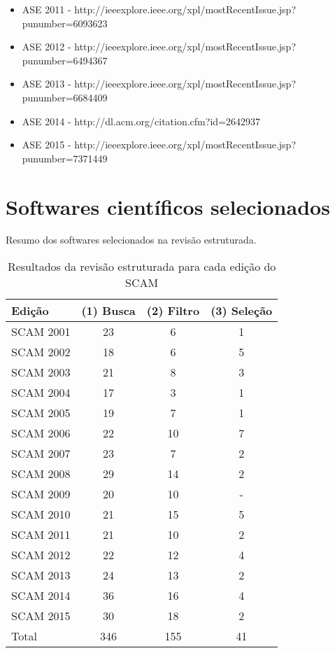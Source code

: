\begin{itemize}
  \item ASE 2011 - {\small http://ieeexplore.ieee.org/xpl/mostRecentIssue.jsp?punumber=6093623}
  \item ASE 2012 - {\small http://ieeexplore.ieee.org/xpl/mostRecentIssue.jsp?punumber=6494367}
  \item ASE 2013 - {\small http://ieeexplore.ieee.org/xpl/mostRecentIssue.jsp?punumber=6684409}
  \item ASE 2014 - {\small http://dl.acm.org/citation.cfm?id=2642937}
  \item ASE 2015 - {\small http://ieeexplore.ieee.org/xpl/mostRecentIssue.jsp?punumber=7371449}
\end{itemize}

\section{Softwares científicos selecionados}
\label{softwares-cientificos}

Resumo dos softwares selecionados na revisão estruturada.

\begin{table}[h]
\caption{Resultados da revisão estruturada para cada edição do SCAM}
\centering
\begin{tabular}{| l | c | c | c |}
  \hline
  Edição & (1) Busca & (2) Filtro & (3) Seleção \\
  \hline
  SCAM 2001 & 23    & 6         & 1           \\
  SCAM 2002 & 18    & 6         & 5           \\
  SCAM 2003 & 21    & 8         & 3           \\
  SCAM 2004 & 17    & 3         & 1           \\
  SCAM 2005 & 19    & 7         & 1           \\
  SCAM 2006 & 22    & 10        & 7           \\
  SCAM 2007 & 23    & 7         & 2           \\
  SCAM 2008 & 29    & 14        & 2           \\
  SCAM 2009 & 20    & 10        & -           \\
  SCAM 2010 & 21    & 15        & 5           \\
  SCAM 2011 & 21    & 10        & 2           \\
  SCAM 2012 & 22    & 12        & 4           \\
  SCAM 2013 & 24    & 13        & 2           \\
  SCAM 2014 & 36    & 16        & 4           \\
  SCAM 2015 & 30    & 18        & 2           \\
  \hline
  Total     & 346   & 155       & 41          \\
  \hline
\end{tabular}
\label{artigos-do-scam}
\end{table}

